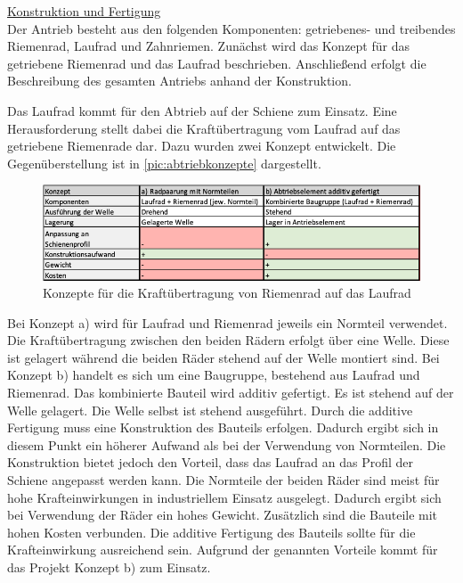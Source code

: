 \underline{Konstruktion und Fertigung}\\
Der Antrieb besteht aus den folgenden Komponenten: getriebenes- und treibendes Riemenrad, Laufrad und Zahnriemen. Zunächst wird das Konzept für das getriebene Riemenrad und das Laufrad beschrieben. Anschließend erfolgt die Beschreibung des gesamten Antriebs anhand der Konstruktion.  

Das Laufrad kommt für den Abtrieb auf der Schiene zum Einsatz. Eine Herausforderung stellt dabei die Kraftübertragung vom Laufrad auf das getriebene Riemenrade dar. Dazu wurden zwei Konzept entwickelt. Die Gegenüberstellung ist in \autoref{pic:abtriebkonzepte} dargestellt.

\begin{figure}[h]
	\begin{center}
		\includegraphics[width=17cm]{abtriebkonzepte.png}
		\caption{Konzepte für die Kraftübertragung von Riemenrad auf das Laufrad}
		\label{pic:abtriebkonzepte}
	\end{center}
\end{figure}
\newpage
Bei Konzept a) wird für  Laufrad und Riemenrad jeweils ein Normteil verwendet. Die Kraftübertragung zwischen den beiden Rädern erfolgt über eine Welle. Diese ist gelagert während die beiden Räder stehend auf der Welle montiert sind.
Bei Konzept b) handelt es sich um eine Baugruppe, bestehend aus Laufrad und Riemenrad. Das kombinierte Bauteil wird additiv gefertigt. Es ist stehend auf der Welle gelagert.  Die Welle selbst ist stehend ausgeführt. 
Durch die additive Fertigung muss eine Konstruktion des Bauteils erfolgen. Dadurch ergibt sich in diesem Punkt ein höherer Aufwand als bei der Verwendung von Normteilen. Die Konstruktion bietet jedoch den Vorteil, dass das Laufrad an das Profil der Schiene angepasst werden kann. Die Normteile der beiden Räder sind meist für hohe Krafteinwirkungen in industriellem Einsatz ausgelegt. Dadurch ergibt sich bei Verwendung der Räder ein hohes Gewicht. Zusätzlich sind die Bauteile mit hohen Kosten verbunden. Die additive Fertigung des Bauteils sollte für die Krafteinwirkung ausreichend sein. Aufgrund der genannten Vorteile kommt für das Projekt Konzept b) zum Einsatz.  

